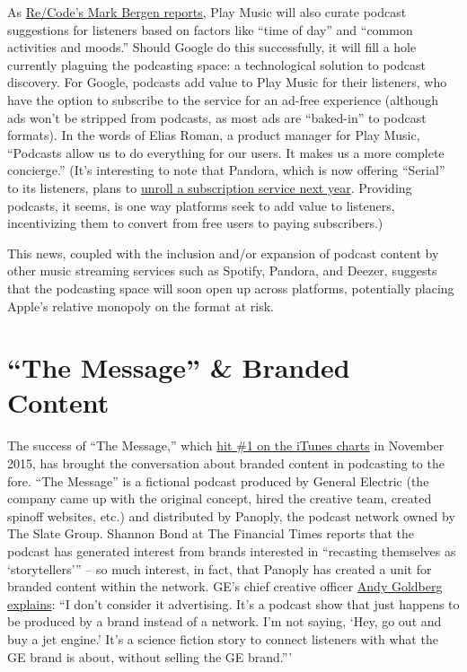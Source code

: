 \documentclass[notoc, symmetric, nobib, nols]{towcenter-guideto-book}
\begin{document}
As \href{http://recode.net/2015/10/27/google-brings-podcasting-to-play-music-swinging-at-apples-dominance/}{Re/Code's Mark Bergen reports}, Play Music will also curate podcast suggestions for listeners based on factors like ``time of day'' and ``common activities and moods.''\autocite{recodegplay} Should Google do this successfully, it will fill a hole currently plaguing the podcasting space: a technological solution to podcast discovery. For Google, podcasts add value to Play Music for their listeners, who have the option to subscribe to the service for an ad-free experience (although ads won't be stripped from podcasts, as most ads are ``baked-in'' to podcast formats). In the words of Elias Roman, a product manager for Play Music, ``Podcasts allow us to do everything for our users. It makes us a more complete concierge.'' (It's interesting to note that Pandora, which is now offering ``Serial'' to its listeners, plans to \href{http://variety.com/2015/digital/news/pandora-rdio-acquisition-1201641583/}{unroll a subscription service next year}.\autocite{varietyPandora} Providing podcasts, it seems, is one way platforms seek to add value to listeners, incentivizing them to convert from free users to paying subscribers.)

This news, coupled with the inclusion and/or expansion of podcast content by other music streaming services such as Spotify, Pandora, and Deezer, suggests that the podcasting space will soon open up across platforms, potentially placing Apple's relative monopoly on the format at risk.

\section{``The Message'' \& Branded Content}
The success of ``The Message,'' which \href{http://www.niemanlab.org/2015/11/how-did-the-ge-branded-podcast-the-message-hit-no-1-on-itunes-in-part-by-sounding-nothing-like-an-ad/}{hit \#1 on the iTunes charts} in November 2015,\autocite{niemanMessage} has brought the conversation about branded content in podcasting to the fore. ``The Message'' is a fictional podcast produced by General Electric (the company came up with the original concept, hired the creative team, created spinoff websites, etc.) and distributed by Panoply, the podcast network owned by The Slate Group. Shannon Bond at The Financial Times reports that the podcast has generated interest from brands interested in ``recasting themselves as `storytellers''' -- so much interest, in fact, that Panoply has created a unit for branded content within the network.\autocite{ftSlateBranded} GE's chief creative officer \href{http://www.niemanlab.org/2015/11/how-did-the-ge-branded-podcast-the-message-hit-no-1-on-itunes-in-part-by-sounding-nothing-like-an-ad/}{Andy Goldberg explains}: ``I don't consider it advertising. It's a podcast show that just happens to be produced by a brand instead of a network. I'm not saying, `Hey, go out and buy a jet engine.' It's a science fiction story to connect listeners with what the GE brand is about, without selling the GE brand.'''\autocite{niemanMessage}
\end{document}
